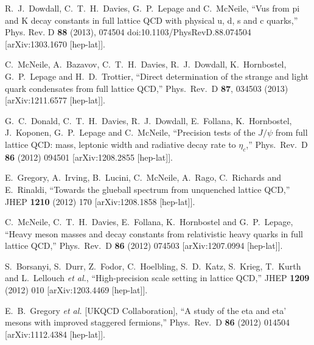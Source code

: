 \begin{thebibliography}{130}
R.~J.~Dowdall, C.~T.~H.~Davies, G.~P.~Lepage and C.~McNeile,
``Vus from pi and K decay constants in full lattice QCD with physical
u, d, s and c quarks,''
Phys. Rev. D \textbf{88} (2013), 074504
doi:10.1103/PhysRevD.88.074504
[arXiv:1303.1670 [hep-lat]].


  C.~McNeile, A.~Bazavov, C.~T.~H.~Davies, R.~J.~Dowdall,
  K.~Hornbostel, G.~P.~Lepage and H.~D.~Trottier,
  ``Direct determination of the strange and light quark condensates
  from full lattice QCD,''
  Phys.\ Rev.\ D {\bf 87}, 034503 (2013)
  [arXiv:1211.6577 [hep-lat]].


  G.~C.~Donald, C.~T.~H.~Davies, R.~J.~Dowdall, E.~Follana,
  K.~Hornbostel, J.~Koponen, G.~P.~Lepage and C.~McNeile,
  ``Precision tests of the $J/{\psi}$ from full lattice QCD: mass,
  leptonic width and radiative decay rate to ${\eta}_c$,''
  Phys.\ Rev.\ D {\bf 86} (2012) 094501
  [arXiv:1208.2855 [hep-lat]].

  E.~Gregory, A.~Irving, B.~Lucini, C.~McNeile, A.~Rago, C.~Richards
  and E.~Rinaldi,
  ``Towards the glueball spectrum from unquenched lattice QCD,''
  JHEP {\bf 1210} (2012) 170
  [arXiv:1208.1858 [hep-lat]].

  C.~McNeile, C.~T.~H.~Davies, E.~Follana, K.~Hornbostel and
  G.~P.~Lepage,
  ``Heavy meson masses and decay constants from relativistic heavy
  quarks in full lattice QCD,''
  Phys.\ Rev.\ D {\bf 86} (2012) 074503
  [arXiv:1207.0994 [hep-lat]].

 S.~Borsanyi, S.~Durr, Z.~Fodor, C.~Hoelbling, S.~D.~Katz, S.~Krieg,
 T.~Kurth and L.~Lellouch {\it et al.},
  ``High-precision scale setting in lattice QCD,''
  JHEP {\bf 1209} (2012) 010
  [arXiv:1203.4469 [hep-lat]].


  E.~B.~Gregory {\it et al.}  [UKQCD Collaboration],
  ``A study of the eta and eta' mesons with improved staggered
  fermions,''
  Phys.\ Rev.\ D {\bf 86} (2012) 014504
  [arXiv:1112.4384 [hep-lat]].


\end{thebibliography}
